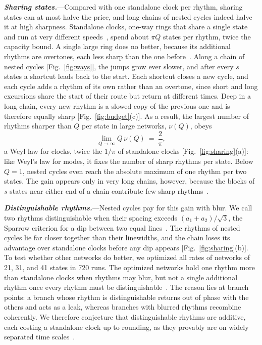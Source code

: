 \documentclass[aps,prl,twocolumn,superscriptaddress,amsmath,amssymb,floatfix,longbibliography]{revtex4-2}
\newcommand{\runin}[1]{\textit{\textbf{#1}}---}
\newcommand{\SMsec}[1]{\cite[Sec.~\ref{#1}]{SM}}
\begin{document}
\runin{Sharing states.}Compared with one standalone clock per rhythm, sharing states can at most halve the price, and long chains of nested cycles indeed halve it at high sharpness. Standalone clocks, one-way rings that share a single state and run at very different speeds~\SMsec{sec:counting}, spend about $\pi Q$ states per rhythm, twice the capacity bound. A single large ring does no better, because its additional rhythms are overtones, each less sharp than the one before~\SMsec{sec:theta}. Along a chain of nested cycles [Fig.~\ref{fig:ways}], the jumps grow ever slower, and after every $s$ states a shortcut leads back to the start. Each shortcut closes a new cycle, and each cycle adds a rhythm of its own rather than an overtone, since short and long excursions share the start of their route but return at different times. Deep in a long chain, every new rhythm is a slowed copy of the previous one and is therefore equally sharp [Fig.~\ref{fig:budget}(c)]. As a result, the largest number of rhythms sharper than $Q$ per state in large networks, $\nu(Q)$, obeys
\begin{equation}
\lim_{Q\to\infty}Q\,\nu(Q)\ =\ \frac{2}{\pi},
\label{eq:weyl}
\end{equation}
a Weyl law for clocks, twice the $1/\pi$ of standalone clocks [Fig.~\ref{fig:sharing}(a)]: like Weyl's law for modes, it fixes the number of sharp rhythms per state. Below $Q=1$, nested cycles even reach the absolute maximum of one rhythm per two states. The gain appears only in very long chains, however, because the blocks of $s$ states near either end of a chain contribute few sharp rhythms~\SMsec{sec:finitechains}.

\runin{Distinguishable rhythms.}Nested cycles pay for this gain with blur. We call two rhythms distinguishable when their spacing exceeds $(a_1+a_2)/\sqrt3$, the Sparrow criterion for a dip between two equal lines~\cite{sparrow1916}. The rhythms of nested cycles lie far closer together than their linewidths, and the chain loses its advantage over standalone clocks before any dip appears [Fig.~\ref{fig:sharing}(b)]. To test whether other networks do better, we optimized all rates of networks of 21, 31, and 41 states in 720 runs. The optimized networks hold one rhythm more than standalone clocks when rhythms may blur, but not a single additional rhythm once every rhythm must be distinguishable~\SMsec{sec:optimized}. The reason lies at branch points: a branch whose rhythm is distinguishable returns out of phase with the others and acts as a leak, whereas branches with blurred rhythms recombine coherently. We therefore conjecture that distinguishable rhythms are additive, each costing a standalone clock up to rounding, as they provably are on widely separated time scales~\SMsec{sec:additive}.
\end{document}
